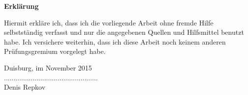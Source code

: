 \begin{center}
\Large{\textsf{\textbf{Erklärung}}}
\end{center}
\vspace{0.8cm}
Hiermit erkläre ich, dass ich die vorliegende Arbeit ohne fremde Hilfe selbstständig
verfasst und nur die angegebenen Quellen und Hilfsmittel benutzt habe. Ich versichere
weiterhin, dass ich diese Arbeit noch keinem anderen Prüfungsgremium vorgelegt habe.

Duisburg, im November 2015
\\[1cm]
.................................................\\[0.2cm]
Denis Repkov